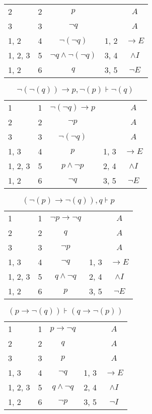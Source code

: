 \documentclass{article}
\begin{document}
\begin{table}[htbp]
\begin{tabular}{lllll}
{2} & 2 & $$p$$ & {} & $$A$$ \\
{3} & 3 & $$¬q$$ & {} & $$A$$ \\
{1, 2} & 4 & $$¬ (¬q)$$ & {1, 2} & $$→E$$ \\
{1, 2, 3} & 5 & $$¬q∧ ¬ (¬q)$$ & {3, 4} & $$∧I$$ \\
{1, 2} & 6 & $$q$$ & {3, 5} & $$¬E$$ \\
\end{tabular}
\end{table}\begin{table}[htbp]\caption*{$¬(¬(q)) → p,¬(p) ⊦ ¬(q)$}\centering\begin{tabular}{lllll}
{1} & 1 & $$¬ (¬q)→p$$ & {} & $$A$$ \\
{2} & 2 & $$¬p$$ & {} & $$A$$ \\
{3} & 3 & $$¬ (¬q)$$ & {} & $$A$$ \\
{1, 3} & 4 & $$p$$ & {1, 3} & $$→E$$ \\
{1, 2, 3} & 5 & $$p∧ ¬p$$ & {2, 4} & $$∧I$$ \\
{1, 2} & 6 & $$¬q$$ & {3, 5} & $$¬E$$ \\
\end{tabular}
\end{table}\begin{table}[htbp]\caption*{$(¬(p) → ¬(q)),q ⊦ p$}\centering\begin{tabular}{lllll}
{1} & 1 & $$¬p→ ¬q$$ & {} & $$A$$ \\
{2} & 2 & $$q$$ & {} & $$A$$ \\
{3} & 3 & $$¬p$$ & {} & $$A$$ \\
{1, 3} & 4 & $$¬q$$ & {1, 3} & $$→E$$ \\
{1, 2, 3} & 5 & $$q∧ ¬q$$ & {2, 4} & $$∧I$$ \\
{1, 2} & 6 & $$p$$ & {3, 5} & $$¬E$$ \\
\end{tabular}
\end{table}\begin{table}[htbp]\caption*{$(p → ¬(q)) ⊦ (q → ¬(p))$}\centering\begin{tabular}{lllll}
{1} & 1 & $$p→ ¬q$$ & {} & $$A$$ \\
{2} & 2 & $$q$$ & {} & $$A$$ \\
{3} & 3 & $$p$$ & {} & $$A$$ \\
{1, 3} & 4 & $$¬q$$ & {1, 3} & $$→E$$ \\
{1, 2, 3} & 5 & $$q∧ ¬q$$ & {2, 4} & $$∧I$$ \\
{1, 2} & 6 & $$¬p$$ & {3, 5} & $$¬I$$ \\

\end{tabular}
\end{table}
\end{document}

